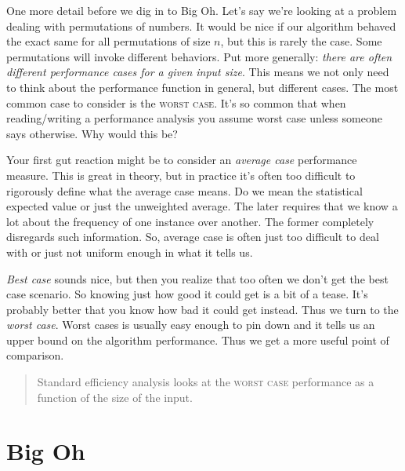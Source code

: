 \documentclass[]{tufte-handout}
\begin{document}
One more detail before we dig in to Big Oh. Let's say we're looking at a problem dealing with permutations of numbers. It would be nice if our algorithm behaved the exact same for all permutations of size $n$, but this is rarely the case.  Some permutations will invoke different behaviors. Put more generally: \textit{there are often different performance cases for a given input size}. This means we not only need to think about the performance function in general, but different cases. The most common case to consider is the \textsc{worst case}. It's so common that when reading/writing a performance analysis you assume worst case unless someone says otherwise.  Why would this be?  

Your first gut reaction might be to consider an \textit{average case} performance measure.  This is great in theory, but in practice it's often too difficult to rigorously define what the average case means. Do we mean the statistical expected value or just the unweighted average.  The later requires that we know a lot about the frequency of one instance over another.  The former completely disregards such information.  So, average case is often just too difficult to deal with or just not uniform enough in what it tells us.

\textit{Best case} sounds nice, but then you realize that too often we don't get the best case scenario.  So knowing just how good it could get is a bit of a tease. It's probably better that you know how bad it could get instead. Thus we turn to the \textit{worst case}.  Worst cases is usually easy enough to pin down and it tells us an upper bound on the algorithm performance. Thus we get a more useful point of comparison. 

\begin{quote}
Standard efficiency analysis looks at the \textsc{worst case} performance as a function of the size of the input.
\end{quote}

\section{Big Oh}
\end{document}
